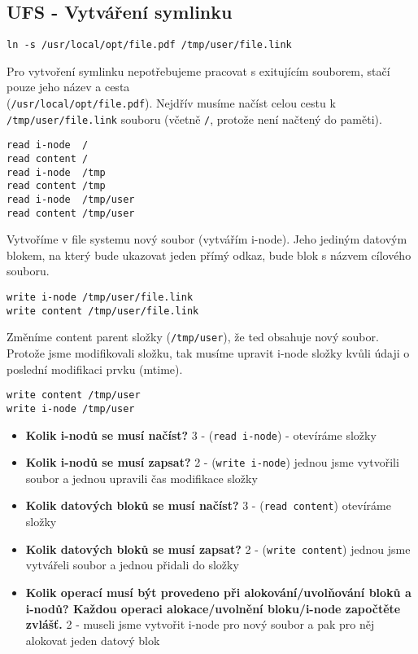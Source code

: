 \subsection{UFS - Vytváření symlinku}

\begin{verbatim}
ln -s /usr/local/opt/file.pdf /tmp/user/file.link
\end{verbatim}

Pro vytvoření symlinku nepotřebujeme pracovat s exitujícím souborem, stačí pouze jeho název a cesta\\ (\texttt{/usr/local/opt/file.pdf}).
Nejdřív musíme načíst celou cestu k \texttt{/tmp/user/file.link} souboru (včetně \texttt{/}, protože není načtený do paměti).

\begin{verbatim}
read i-node  /
read content /
read i-node  /tmp
read content /tmp
read i-node  /tmp/user
read content /tmp/user
\end{verbatim}

Vytvoříme v file systemu nový soubor (vytvářím i-node). Jeho jediným datovým blokem, na který bude ukazovat jeden přímý odkaz, bude blok s názvem cílového souboru.
\begin{verbatim}
write i-node /tmp/user/file.link
write content /tmp/user/file.link
\end{verbatim}

Změníme content parent složky (\texttt{/tmp/user}), že ted obsahuje nový soubor. Protože jsme modifikovali složku, tak musíme upravit i-node složky kvůli údaji o poslední modifikaci prvku (mtime).
\begin{verbatim}
write content /tmp/user
write i-node /tmp/user
\end{verbatim}

\begin{itemize}
    \item 
        \textbf{Kolik i-nodů se musí načíst?} 3 
        - (\texttt{read i-node}) - otevíráme složky
    \item 
        \textbf{Kolik i-nodů se musí zapsat?} 2 
        - (\texttt{write i-node}) jednou jsme vytvořili soubor a jednou upravili čas modifikace složky
    \item 
        \textbf{Kolik datových bloků se musí načíst?} 3 
        - (\texttt{read content}) otevíráme složky
    \item
        \textbf{Kolik datových bloků se musí zapsat?} 2
        - (\texttt{write content}) jednou jsme vytvářeli soubor a jednou přidali do složky
    \item
        \textbf{Kolik operací musí být provedeno při alokování/uvolňování bloků a i-nodů? Každou operaci alokace/uvolnění bloku/i-node započtěte zvlášť.} 2
        - museli jsme vytvořit i-node pro nový soubor a pak pro něj alokovat jeden datový blok
\end{itemize}
